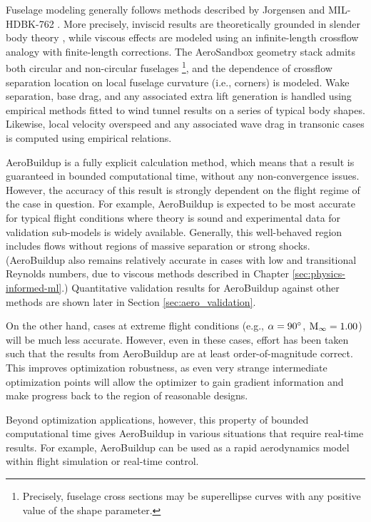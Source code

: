Fuselage modeling generally follows methods described by Jorgensen \cite{jorgensen_method_1973, jorgensen_prediction_1979} and MIL-HDBK-762 \cite{_design_1990}. More precisely, inviscid results are theoretically grounded in slender body theory \cite{fva}, while viscous effects are modeled using an infinite-length crossflow analogy with finite-length corrections. The AeroSandbox geometry stack admits both circular and non-circular fuselages \footnote{Precisely, fuselage cross sections may be superellipse curves with any positive value of the shape parameter.}, and the dependence of crossflow separation location on local fuselage curvature (i.e., corners) is modeled. Wake separation, base drag, and any associated extra lift generation is handled using empirical methods fitted to wind tunnel results on a series of typical body shapes. Likewise, local velocity overspeed and any associated wave drag in transonic cases is computed using empirical relations.

AeroBuildup is a fully explicit calculation method, which means that a result is guaranteed in bounded computational time, without any non-convergence issues. However, the accuracy of this result is strongly dependent on the flight regime of the case in question. For example, AeroBuildup is expected to be most accurate for typical flight conditions where theory is sound and experimental data for validation sub-models is widely available. Generally, this well-behaved region includes flows without regions of massive separation or strong shocks. (AeroBuildup also remains relatively accurate in cases with low and transitional Reynolds numbers, due to viscous methods described in Chapter \ref{sec:physics-informed-ml}.) Quantitative validation results for AeroBuildup against other methods are shown later in Section \ref{sec:aero_validation}.

On the other hand, cases at extreme flight conditions (e.g., $\alpha=90\degree$, $\rm M_\infty=1.00$) will be much less accurate. However, even in these cases, effort has been taken such that the results from AeroBuildup are at least order-of-magnitude correct. This improves optimization robustness, as even very strange intermediate optimization points will allow the optimizer to gain gradient information and make progress back to the region of reasonable designs.

Beyond optimization applications, however, this property of bounded computational time gives AeroBuildup in various situations that require real-time results. For example, AeroBuildup can be used as a rapid aerodynamics model within flight simulation or real-time control.

